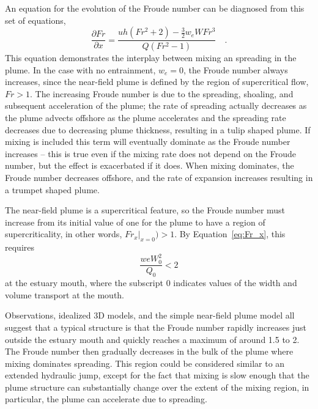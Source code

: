 \documentclass[12pt]{article}
\begin{document}
An equation for the evolution of the Froude number can be diagnosed from this set of equations, 
\begin{equation}
\frac{\partial Fr}{\partial x} = \frac{ u h (Fr^2+2) - \frac{3}{2} w_e W  Fr^3}{ Q (Fr^2-1)} \quad .
\label{eq:Fr_x}
\end{equation}
This equation demonstrates the interplay between mixing an spreading in the plume. In the case with no entrainment, $w_e = 0$, the Froude number always increases, since the near-field plume is defined by the region of supercritical flow, $Fr>1$. The increasing Froude number is due to the spreading, shoaling, and subsequent acceleration of the plume; the rate of spreading actually decreases as the plume advects offshore as the plume accelerates and the spreading rate decreases due to decreasing plume thickness, resulting in a tulip shaped plume. If mixing is included this term will eventually dominate as the Froude number increases -- this is true even if the mixing rate does not depend on the Froude number, but the effect is exacerbated if it does. When mixing dominates, the Froude number decreases offshore, and the rate of expansion increases resulting in a trumpet shaped plume. 

The near-field plume is a supercritical feature, so the Froude number must increase from its initial value of one for the plume to have a region of supercriticality, in other words, $Fr_x|_{x=0}) > 1$. By Equation~\ref{eq:Fr_x}, this requires
\begin{equation}
    \frac{we W_0^2}{Q_0} < 2
    \label{eq:criticality}
\end{equation}
at the estuary mouth, where the subscript $0$ indicates values of the width and volume transport at the mouth.

Observations, idealized 3D models, and the simple near-field plume model all suggest that a typical structure is that the Froude number rapidly increases just outside the estuary mouth and quickly reaches a maximum of around 1.5 to 2. The Froude number then gradually decreases in the bulk of the plume where mixing dominates spreading. This region could be considered similar to an extended hydraulic jump, except for the fact that mixing is slow enough that the plume structure can substantially change over the extent of the mixing region, in particular, the plume can accelerate due to spreading.
\end{document}
